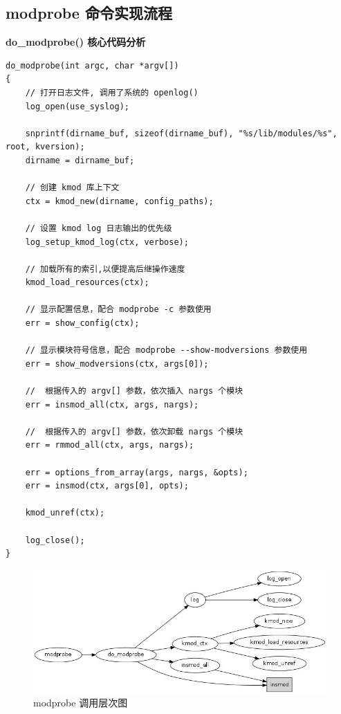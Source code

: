 \subsection{modprobe 命令实现流程}

\textbf{do\_modprobe() 核心代码分析}

{\begin{shaded}\begin{verbatim}
do_modprobe(int argc, char *argv[])
{
    // 打开日志文件, 调用了系统的 openlog()
    log_open(use_syslog);

    snprintf(dirname_buf, sizeof(dirname_buf), "%s/lib/modules/%s", root, kversion);
    dirname = dirname_buf;

    // 创建 kmod 库上下文
    ctx = kmod_new(dirname, config_paths);

    // 设置 kmod log 日志输出的优先级
    log_setup_kmod_log(ctx, verbose);

    // 加载所有的索引,以便提高后继操作速度
    kmod_load_resources(ctx);

    // 显示配置信息，配合 modprobe -c 参数使用
    err = show_config(ctx); 

    // 显示模块符号信息，配合 modprobe --show-modversions 参数使用
    err = show_modversions(ctx, args[0]);

    //  根据传入的 argv[] 参数，依次插入 nargs 个模块
    err = insmod_all(ctx, args, nargs);

    //  根据传入的 argv[] 参数，依次卸载 nargs 个模块
    err = rmmod_all(ctx, args, nargs); 

    err = options_from_array(args, nargs, &opts);
    err = insmod(ctx, args[0], opts);

    kmod_unref(ctx);

    log_close();
}
\end{verbatim}\end{shaded}}
\begin{figure}[htbp]
\centering
\includegraphics{./figures/modprobe.jpg}
\caption{modprobe 调用层次图}
\end{figure}

